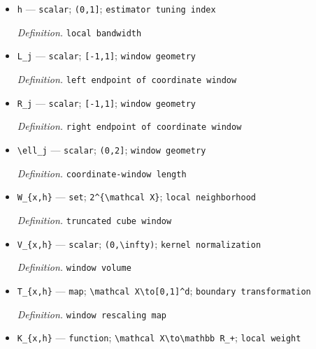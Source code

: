 \documentclass{article}
\begin{document}
\begin{itemize}
  \par\smallskip\noindent\emph{Definition.} \texttt{witness arm-\allowbreak{}specific Bernoulli probability}
  \item \texttt{h} --- \texttt{scalar}; \texttt{(0,\allowbreak{}1]}; \texttt{estimator tuning index}
  \par\smallskip\noindent\emph{Definition.} \texttt{local bandwidth}
  \item \texttt{L\_\allowbreak{}j} --- \texttt{scalar}; \texttt{[-\allowbreak{}1,\allowbreak{}1]}; \texttt{window geometry}
  \par\smallskip\noindent\emph{Definition.} \texttt{left endpoint of coordinate window}
  \item \texttt{R\_\allowbreak{}j} --- \texttt{scalar}; \texttt{[-\allowbreak{}1,\allowbreak{}1]}; \texttt{window geometry}
  \par\smallskip\noindent\emph{Definition.} \texttt{right endpoint of coordinate window}
  \item \texttt{\textbackslash{}\allowbreak{}ell\_\allowbreak{}j} --- \texttt{scalar}; \texttt{(0,\allowbreak{}2]}; \texttt{window geometry}
  \par\smallskip\noindent\emph{Definition.} \texttt{coordinate-\allowbreak{}window length}
  \item \texttt{W\_\allowbreak{}\{x,\allowbreak{}h\}\allowbreak{}} --- \texttt{set}; \texttt{2\textasciicircum{}\{\textbackslash{}\allowbreak{}mathcal X\}\allowbreak{}}; \texttt{local neighborhood}
  \par\smallskip\noindent\emph{Definition.} \texttt{truncated cube window}
  \item \texttt{V\_\allowbreak{}\{x,\allowbreak{}h\}\allowbreak{}} --- \texttt{scalar}; \texttt{(0,\allowbreak{}\textbackslash{}\allowbreak{}infty)}; \texttt{kernel normalization}
  \par\smallskip\noindent\emph{Definition.} \texttt{window volume}
  \item \texttt{T\_\allowbreak{}\{x,\allowbreak{}h\}\allowbreak{}} --- \texttt{map}; \texttt{\textbackslash{}\allowbreak{}mathcal X\textbackslash{}\allowbreak{}to[0,\allowbreak{}1]\textasciicircum{}d}; \texttt{boundary transformation}
  \par\smallskip\noindent\emph{Definition.} \texttt{window rescaling map}
  \item \texttt{K\_\allowbreak{}\{x,\allowbreak{}h\}\allowbreak{}} --- \texttt{function}; \texttt{\textbackslash{}\allowbreak{}mathcal X\textbackslash{}\allowbreak{}to\textbackslash{}\allowbreak{}mathbb R\_\allowbreak{}+\allowbreak{}}; \texttt{local weight}

\end{itemize}
\end{document}
